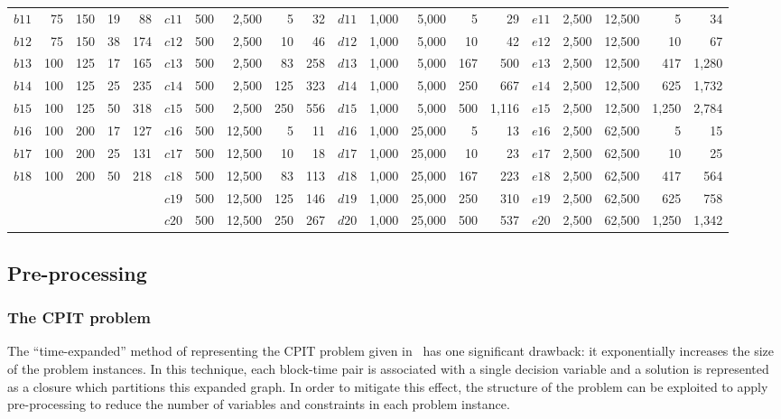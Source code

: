 \documentclass[journal]{IEEEtran}
\begin{document}
\begin{table}[h]
\begin{adjustbox}{width=\textwidth}
\begin{tabular}{lrrrr|lrrrr|lrrrr|lrrrr}
$b11$ & 75 & 150 & 19 & 88& $c11$ & 500 & 2,500 & 5 &32&  $d11$ & 1,000 & 5,000 & 5 & 29& $e11$ & 2,500 & 12,500 & 5 &34\\
$b12$ & 75 & 150 & 38 & 174& $c12$ & 500 & 2,500 & 10 & 46&  $d12$ & 1,000 & 5,000 & 10 & 42& $e12$ & 2,500 & 12,500 & 10 & 67\\
$b13$ & 100 & 125 & 17 & 165& $c13$ & 500 & 2,500 & 83 & 258&  $d13$ & 1,000 & 5,000 & 167 & 500& $e13$ & 2,500 & 12,500 & 417 & 1,280\\
$b14$ & 100 & 125 & 25 & 235& $c14$ & 500 & 2,500 & 125 & 323&  $d14$ & 1,000 & 5,000 & 250 & 667& $e14$ & 2,500 & 12,500 & 625 & 1,732\\
$b15$ & 100 & 125 & 50 & 318& $c15$ & 500 & 2,500 & 250 & 556&  $d15$ & 1,000 & 5,000 & 500 & 1,116& $e15$ & 2,500 & 12,500 & 1,250 & 2,784\\
$b16$ & 100 & 200 & 17 & 127& $c16$ & 500 & 12,500 & 5 & 11&  $d16$ & 1,000 & 25,000 & 5 & 13& $e16$ & 2,500 & 62,500 & 5 & 15\\
$b17$ & 100 & 200 & 25 & 131& $c17$ & 500 & 12,500 & 10 & 18&  $d17$ & 1,000 & 25,000 & 10 & 23& $e17$ & 2,500 & 62,500 & 10 & 25\\
$b18$ & 100 & 200 & 50 & 218& $c18$ & 500 & 12,500 & 83 & 113&  $d18$ & 1,000 & 25,000 & 167 & 223& $e18$ & 2,500 & 62,500 & 417 & 564\\
&&&&& $c19$ & 500 & 12,500 & 125 & 146 &$d19$ & 1,000 & 25,000 & 250 & 310& $e19$ & 2,500 & 62,500 & 625 & 758\\
&&&&& $c20$ & 500 & 12,500 & 250 & 267 &$d20$ & 1,000 & 25,000 & 500 & 537& $e20$ & 2,500 & 62,500 & 1,250 & 1,342\\
\bottomrule
\end{tabular}
\end{adjustbox}
\end{table}

\subsection{Pre-processing}
\subsubsection*{The CPIT problem}
The ``time-expanded'' method of representing the CPIT problem given in~\cite{Kenny:2017} has one significant drawback: it exponentially increases the size of the problem instances. In this technique, each block-time pair is associated with a single decision variable and a solution is represented as a closure which partitions this expanded graph. In order to mitigate this effect, the structure of the problem can be exploited to apply pre-processing to reduce the number of variables and constraints in each problem instance.
\end{document}
